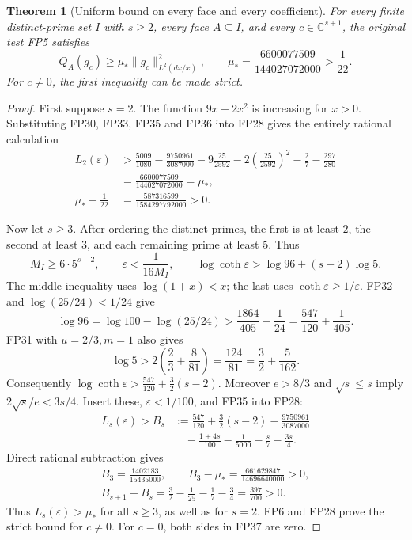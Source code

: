\documentclass[11pt,a4paper]{article}
\newtheorem{theorem}{Theorem}[section]
\theoremstyle{definition}\newtheorem{definition}[theorem]{Definition}
\newcommand{\C}{\mathbb C}\newcommand{\R}{\mathbb R}
\begin{document}
\begin{theorem}[Uniform bound on every face and every coefficient]
\label{fp:thm:bound}
For every finite distinct-prime set \(I\) with \(s\ge2\), every
face \(A\subseteq I\), and every \(c\in\C^{s+1}\), the original
test FP5 satisfies
\[
 Q_A(g_c)\ge\mu_*\|g_c\|_{L^2(dx/x)}^2,\qquad
 \mu_*=\frac{6600077509}{144027072000}>\frac1{22}.
 \tag{FP37}\label{fp:fpb:main}
\]
For \(c\ne0\), the first inequality can be made strict.
\end{theorem}
\begin{proof}
First suppose \(s=2\). The function \(9x+2x^2\) is increasing
for \(x>0\). Substituting FP30, FP33, FP35 and FP36
into FP28 gives the entirely rational calculation
\[
 \begin{aligned}
 L_2(\varepsilon)
 &>\frac{5009}{1080}-\frac{9750961}{3087000}
       -9\frac{25}{2592}
       -2\left(\frac{25}{2592}\right)^2
       -\frac27-\frac{297}{280}\\
 &=\frac{6600077509}{144027072000}=\mu_*,\\
 \mu_*-\frac1{22}
 &=\frac{587316599}{1584297792000}>0 .
 \end{aligned}
 \tag{FP38}\label{fp:fpb:mu-arithmetic}
\]

Now let \(s\ge3\). After ordering the distinct primes, the
first is at least \(2\), the second at least \(3\), and each
remaining prime at least \(5\). Thus
\[
 M_I\ge6\cdot5^{s-2},\qquad
 \varepsilon<\frac1{16M_I},\qquad
 \log\coth\varepsilon>\log96+(s-2)\log5 .
 \tag{FP39}
\]
The middle inequality uses \(\log(1+x)<x\); the last uses
\(\coth\varepsilon\ge1/\varepsilon\).
FP32 and \(\log(25/24)<1/24\) give
\[
 \log96=\log100-\log(25/24)
 >\frac{1864}{405}-\frac1{24}
 =\frac{547}{120}+\frac1{405}.
 \tag{FP40}
\]
FP31 with \(u=2/3,m=1\) also gives
\[
 \log5>2\left(\frac23+\frac8{81}\right)
 =\frac{124}{81}=\frac32+\frac5{162}.
 \tag{FP41}
\]
Consequently
\(\log\coth\varepsilon>\frac{547}{120}+\frac32(s-2)\).
Moreover \(e>8/3\) and \(\sqrt s\le s\) imply
\(2\sqrt s/e<3s/4\).
Insert these, \(\varepsilon<1/100\), and FP35 into FP28:
\[
 \begin{aligned}
 L_s(\varepsilon)>B_s
 &:=
 \frac{547}{120}+\frac32(s-2)-\frac{9750961}{3087000}\\
 &\quad-\frac{1+4s}{100}-\frac1{5000}-\frac s7-\frac{3s}{4}.
 \end{aligned}
 \tag{FP42}
\]
Direct rational subtraction gives
\[
 \begin{gathered}
 B_3=\frac{1402183}{15435000},\qquad
 B_3-\mu_*=\frac{661629847}{14696640000}>0,\\
 B_{s+1}-B_s
   =\frac32-\frac1{25}-\frac17-\frac34
   =\frac{397}{700}>0.
 \end{gathered}
 \tag{FP43}\label{fp:fpb:large-s}
\]
Thus \(L_s(\varepsilon)>\mu_*\) for all \(s\ge3\), as well as for
\(s=2\). FP6 and FP28 prove the strict bound for \(c\ne0\).
For \(c=0\), both sides in FP37 are zero.
\end{proof}
\end{document}
